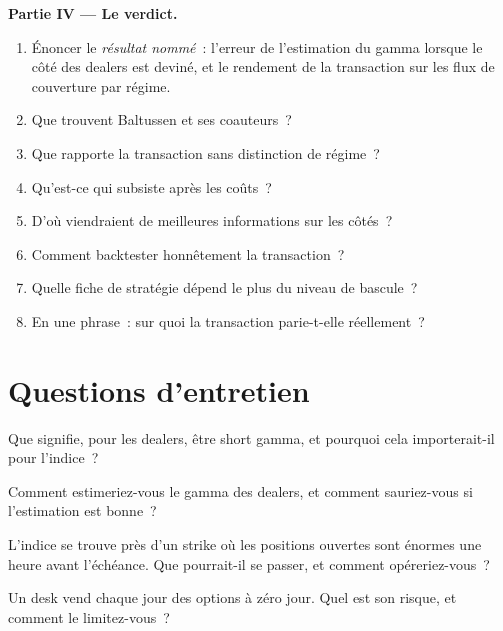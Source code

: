 \begin{problem}
\medskip\noindent\textbf{Partie IV --- Le verdict.}
\begin{enumerate}[resume]
\item Énoncer le \emph{résultat nommé}~: l'erreur de l'estimation du gamma lorsque le côté des dealers est deviné, et le rendement de la transaction sur les flux de couverture par
régime.
\item Que trouvent Baltussen et ses coauteurs~?
\item Que rapporte la transaction sans distinction de régime~?
\item Qu'est-ce qui subsiste après les coûts~?
\item D'où viendraient de meilleures informations sur les côtés~?
\item Comment backtester honnêtement la transaction~?
\item Quelle fiche de stratégie dépend le plus du niveau de bascule~?
\item En une phrase~: sur quoi la transaction parie-t-elle réellement~?
\end{enumerate}
\end{problem}

\section{Questions d'entretien}

\begin{interviewq}\label{iq:s2:zero-day-options-and-dealer-gamma-flows:1}
Que signifie, pour les dealers, être short gamma, et pourquoi cela importerait-il pour l'indice~?
\end{interviewq}

\begin{interviewq}\label{iq:s2:zero-day-options-and-dealer-gamma-flows:2}
Comment estimeriez-vous le gamma des dealers, et comment sauriez-vous si l'estimation est bonne~?
\end{interviewq}

\begin{interviewq}\label{iq:s2:zero-day-options-and-dealer-gamma-flows:3}
L'indice se trouve près d'un strike où les positions ouvertes sont énormes une heure avant l'échéance. Que pourrait-il se passer, et comment opéreriez-vous~?
\end{interviewq}

\begin{interviewq}\label{iq:s2:zero-day-options-and-dealer-gamma-flows:4}
Un desk vend chaque jour des options à zéro jour. Quel est son risque, et comment le limitez-vous~?
\end{interviewq}

